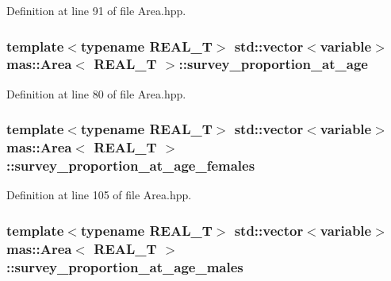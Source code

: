 Definition at line 91 of file Area.\-hpp.

\hypertarget{structmas_1_1_area_a4a85aa755774a12a5fa4e7debda4cdad}{
\subsubsection[{survey\-\_\-proportion\-\_\-at\-\_\-age}]{\setlength{\rightskip}{0pt plus 5cm}template$<$typename R\-E\-A\-L\-\_\-\-T$>$ std\-::vector$<${\bf variable}$>$ {\bf mas\-::\-Area}$<$ R\-E\-A\-L\-\_\-\-T $>$\-::survey\-\_\-proportion\-\_\-at\-\_\-age}}\label{structmas_1_1_area_a4a85aa755774a12a5fa4e7debda4cdad}


Definition at line 80 of file Area.\-hpp.

\hypertarget{structmas_1_1_area_a58a763df34868ff121faabd55c2f9741}{
\subsubsection[{survey\-\_\-proportion\-\_\-at\-\_\-age\-\_\-females}]{\setlength{\rightskip}{0pt plus 5cm}template$<$typename R\-E\-A\-L\-\_\-\-T$>$ std\-::vector$<${\bf variable}$>$ {\bf mas\-::\-Area}$<$ R\-E\-A\-L\-\_\-\-T $>$\-::survey\-\_\-proportion\-\_\-at\-\_\-age\-\_\-females}}\label{structmas_1_1_area_a58a763df34868ff121faabd55c2f9741}


Definition at line 105 of file Area.\-hpp.

\hypertarget{structmas_1_1_area_ab2207ba2c622fe615b415efa69df5f84}{
\subsubsection[{survey\-\_\-proportion\-\_\-at\-\_\-age\-\_\-males}]{\setlength{\rightskip}{0pt plus 5cm}template$<$typename R\-E\-A\-L\-\_\-\-T$>$ std\-::vector$<${\bf variable}$>$ {\bf mas\-::\-Area}$<$ R\-E\-A\-L\-\_\-\-T $>$\-::survey\-\_\-proportion\-\_\-at\-\_\-age\-\_\-males}}\label{structmas_1_1_area_ab2207ba2c622fe615b415efa69df5f84}


